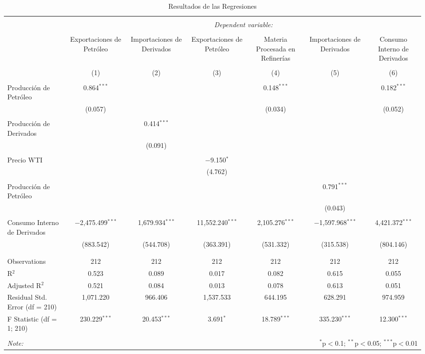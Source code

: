 
\begin{table}[!htbp] \centering 
  \caption{Resultados de las Regresiones} 
  \label{} 
\begin{tabular}{@{\extracolsep{5pt}}lcccccc} 
\\[-1.8ex]\hline 
\hline \\[-1.8ex] 
 & \multicolumn{6}{c}{\textit{Dependent variable:}} \\ 
\cline{2-7} 
\\[-1.8ex] & Exportaciones de Petróleo & Importaciones de Derivados & Exportaciones de Petróleo & Materia Procesada en Refinerías & Importaciones de Derivados & Consumo Interno de Derivados \\ 
\\[-1.8ex] & (1) & (2) & (3) & (4) & (5) & (6)\\ 
\hline \\[-1.8ex] 
 Producción de Petróleo & 0.864$^{***}$ &  &  & 0.148$^{***}$ &  & 0.182$^{***}$ \\ 
  & (0.057) &  &  & (0.034) &  & (0.052) \\ 
  & & & & & & \\ 
 Producción de Derivados &  & 0.414$^{***}$ &  &  &  &  \\ 
  &  & (0.091) &  &  &  &  \\ 
  & & & & & & \\ 
 Precio WTI &  &  & $-$9.150$^{*}$ &  &  &  \\ 
  &  &  & (4.762) &  &  &  \\ 
  & & & & & & \\ 
 Producción de Petróleo &  &  &  &  & 0.791$^{***}$ &  \\ 
  &  &  &  &  & (0.043) &  \\ 
  & & & & & & \\ 
 Consumo Interno de Derivados & $-$2,475.499$^{***}$ & 1,679.934$^{***}$ & 11,552.240$^{***}$ & 2,105.276$^{***}$ & $-$1,597.968$^{***}$ & 4,421.372$^{***}$ \\ 
  & (883.542) & (544.708) & (363.391) & (531.332) & (315.538) & (804.146) \\ 
  & & & & & & \\ 
\hline \\[-1.8ex] 
Observations & 212 & 212 & 212 & 212 & 212 & 212 \\ 
R$^{2}$ & 0.523 & 0.089 & 0.017 & 0.082 & 0.615 & 0.055 \\ 
Adjusted R$^{2}$ & 0.521 & 0.084 & 0.013 & 0.078 & 0.613 & 0.051 \\ 
Residual Std. Error (df = 210) & 1,071.220 & 966.406 & 1,537.533 & 644.195 & 628.291 & 974.959 \\ 
F Statistic (df = 1; 210) & 230.229$^{***}$ & 20.453$^{***}$ & 3.691$^{*}$ & 18.789$^{***}$ & 335.230$^{***}$ & 12.300$^{***}$ \\ 
\hline 
\hline \\[-1.8ex] 
\textit{Note:}  & \multicolumn{6}{r}{$^{*}$p$<$0.1; $^{**}$p$<$0.05; $^{***}$p$<$0.01} \\ 
\end{tabular} 
\end{table} 
